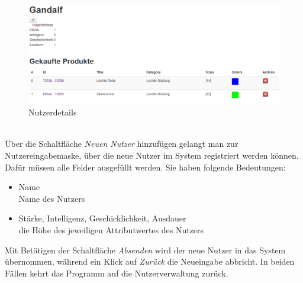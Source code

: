 \begin{figure}[h!]
  \centering
  \includegraphics[width=\textwidth]{img/Nutzerdetails.png}
  \caption{Nutzerdetails}
  \label{fig:Nutzerdetails}
\end{figure}
\text{}\vspace*{-1em}\\
Über die Schaltfläche \textit{Neuen Nutzer} hinzufügen gelangt man zur Nutzereingabemaske, über die neue Nutzer im System registriert werden können. Dafür müssen alle Felder ausgefüllt werden. Sie haben folgende Bedeutungen:
\begin{itemize}
  \item Name \\
        Name des Nutzers
  \vspace*{-0.5em}
  \item Stärke, Intelligenz, Geschicklichkeit, Ausdauer \\
        die Höhe des jeweiligen Attributwertes des Nutzers
\end{itemize}
Mit Betätigen der Schaltfläche \textit{Absenden} wird der neue Nutzer in das System über\-nommen, während ein Klick auf \textit{Zurück} die Neueingabe abbricht. In beiden Fällen kehrt das Programm auf die Nutzerverwaltung zurück.



